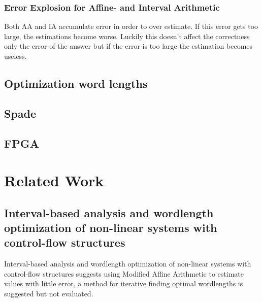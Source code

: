\documentclass[msc,lith,english]{liuthesis}
\begin{document}
\subsection{Error Explosion for Affine- and Interval Arithmetic }

Both AA and IA accumulate error in order to over estimate. If this error gets too large, the estimations become worse. Luckily this doesn't affect the correctness only the error of the answer but if the error is too large the estimation becomes useless.


\section{Optimization word lengths}

\section{Spade}

\section{FPGA}


\chapter{Related Work}

\section{Interval-based analysis and wordlength optimization of non-linear systems with control-flow structures}
Interval-based analysis and wordlength optimization of non-linear systems with control-flow structures suggests using Modified Affine Arithmetic to estimate values with little error, a method for iterative finding optimal wordlengths is suggested but not evaluated.

\cite{src:WlOpNLSystems}
\end{document}

